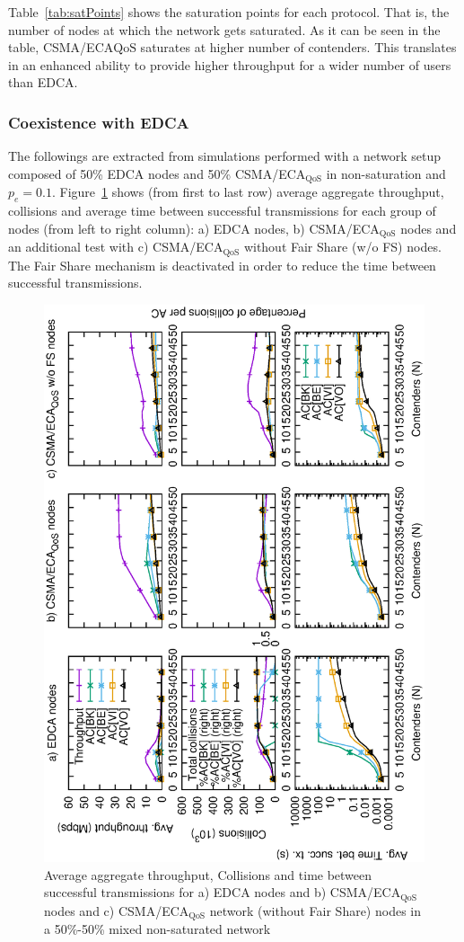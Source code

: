 
Table~\ref{tab:satPoints} shows the saturation points for each protocol. That is, the number of nodes at which the network gets saturated. As it can be seen in the table, CSMA/ECA${\text{QoS}}$ saturates at higher number of contenders. This translates in an enhanced ability to provide higher throughput for a wider number of users than EDCA.

\subsubsection{Coexistence with EDCA}

The followings are extracted from simulations performed with a network setup composed of 50\% EDCA nodes and 50\% CSMA/ECA$_{\text{QoS}}$ in non-saturation and $p_e=0.1$. Figure~\ref{fig:multiplotCombinedUnsat} shows (from first to last row) average aggregate throughput, collisions and average time between successful transmissions for each group of nodes (from left to right column): a) EDCA nodes, b) CSMA/ECA$_{\text{QoS}}$ nodes and an additional test with c) CSMA/ECA$_{\text{QoS}}$ without Fair Share (w/o FS) nodes. The Fair Share mechanism is deactivated in order to reduce the time between successful transmissions.

\begin{figure}[t]
	\centering
		\includegraphics[width=0.7\linewidth,angle = -90]{figures/multiplot-combined-unsat-error-0-1.eps}
		\caption{Average aggregate throughput, Collisions and time between successful transmissions for a) EDCA nodes and b) CSMA/ECA$_{\text{QoS}}$ nodes and c) CSMA/ECA$_{\text{QoS}}$ network (without Fair Share) nodes in a 50\%-50\% mixed non-saturated network}
		\label{fig:multiplotCombinedUnsat}
\end{figure}

